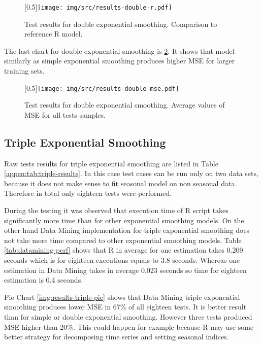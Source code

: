         \begin{figure}[H]
            \begin{center}
                \scalebox{0.65}[0.5]{\texttt{[image: img/src/results-double-r.pdf]}}
                \caption{Test results for double exponential smoothing. Comparison to reference R model.}
                \label{img:results-double-r}
            \end{center}
        \end{figure}

        The last chart for double exponential smoothing is \ref{img:results-double-mse}.
        It shows that model similarly as simple exponential smoothing produces higher MSE for larger training sets.

        \begin{figure}[H]
            \begin{center}
                \scalebox{0.65}[0.5]{\texttt{[image: img/src/results-double-mse.pdf]}}
                \caption{Test results for double exponential smoothing. Average values of MSE for all tests samples.}
                \label{img:results-double-mse}
            \end{center}
        \end{figure}

        \subsection{Triple Exponential Smoothing} \label{sec:results-triple}
        Raw tests results for triple exponential smoothing are listed in Table \ref{appen:tab:triple-results}. In
        this case test cases can be run only on two data sets, because it does not make sense to fit seasonal
        model on non seasonal data. Therefore in total only eighteen tests were performed.

        During the testing it was observed that execution time of R script takes significantly more time than for other
        exponential smoothing models. On the other hand Data Mining implementation for triple exponential smoothing
        does not take more time compared to other exponential smoothing models. Table \ref{tab:datamining-perf} shows
        that R in average for one estimation takes 0.209 seconds which is for eighteen executions equals to 3.8 seconds.
        Whereas one estimation in Data Mining takes in average 0.023 seconds so time for eighteen estimation is 0.4
        seconds.

        Pie Chart \ref{img:results-triple-pie} shows that Data Mining triple exponential smoothing produces lower MSE
        in 67\% of all eighteen tests. It is better result than for simple or double exponential smoothing. However
        three tests produced MSE higher than 20\%. This could happen for example because R may use some better strategy
        for decomposing time series and setting seasonal indices.

